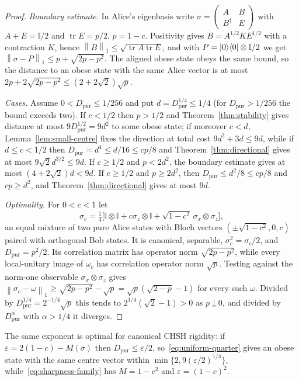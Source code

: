 \documentclass[11pt]{article}
\theoremstyle{remark}\newtheorem{remark}[theorem]{Remark}
\DeclareMathOperator{\tr}{tr}\DeclareMathOperator{\diag}{diag}
\newcommand{\id}{\mathbb I}\newcommand{\ket}[1]{|#1\rangle}
\newcommand{\norm}[1]{\left\lVert#1\right\rVert}
\newcommand{\eps}{\varepsilon}
\newcommand{\Dp}{D_{\mathrm{pur}}}
\begin{document}
\begin{proof}
\emph{Boundary estimate.} In Alice's eigenbasis write
$\sigma=\left(\begin{smallmatrix}A&B\\B^\dagger&E\end{smallmatrix}\right)$ with
$A+E=\id/2$ and $\tr E=p/2$, $p=1-c$. Positivity gives $B=A^{1/2}KE^{1/2}$ with
a contraction $K$, hence $\norm B_1\le\sqrt{\tr A\tr E}$, and with
$P=\proj0\otimes\id/2$ we get $\norm{\sigma-P}_1\le p+\sqrt{2p-p^2}$. The
aligned obese state obeys the same bound, so the distance to an obese state
with the same Alice vector is at most $2p+2\sqrt{2p-p^2}\le(2+2\sqrt2)\sqrt p$.

\emph{Cases.} Assume $0<\Dp\le1/256$ and put $d=\Dp^{1/4}\le1/4$ (for
$\Dp>1/256$ the bound exceeds two). If $c<1/2$ then $p>1/2$ and
Theorem~\ref{thm:stability} gives distance at most $9\Dp^{1/2}=9d^2$ to some
obese state; if moreover $c<d$, Lemma~\ref{lem:small-centre} fixes the
direction at total cost $9d^2+3d\le9d$, while if $d\le c<1/2$ then
$\Dp=d^4\le d/16\le cp/8$ and Theorem~\ref{thm:directional} gives at most
$9\sqrt2d^{3/2}\le9d$. If $c\ge1/2$ and $p<2d^2$, the boundary estimate gives
at most $(4+2\sqrt2)d<9d$. If $c\ge1/2$ and $p\ge2d^2$, then
$\Dp\le d^2/8\le cp/8$ and $cp\ge d^2$, and Theorem~\ref{thm:directional} gives
at most $9d$.

\emph{Optimality.} For $0<c<1$ let
\begin{equation}\label{eq:sharpness-family}
 \sigma_c=\tfrac14\bigl[\id\otimes\id+c\sigma_z\otimes\id+\sqrt{1-c^2}\,\sigma_x\otimes\sigma_z\bigr],
\end{equation}
an equal mixture of two pure Alice states with Bloch vectors
$(\pm\sqrt{1-c^2},0,c)$ paired with orthogonal Bob states. It is canonical,
separable, $\sigma_c^2=\sigma_c/2$, and $\Dp=p^2/2$. Its correlation matrix
has operator norm $\sqrt{2p-p^2}$, while every local-unitary image of
$\omega_c$ has correlation operator norm $\sqrt p$. Testing against the
norm-one observable $\sigma_x\otimes\sigma_z$ gives
$\norm{\sigma_c-\omega}_1\ge\sqrt{2p-p^2}-\sqrt p=\sqrt p(\sqrt{2-p}-1)$ for
every such $\omega$. Divided by $\Dp^{1/4}=2^{-1/4}\sqrt p$ this tends to
$2^{1/4}(\sqrt2-1)>0$ as $p\downarrow0$, and divided by $\Dp^{\alpha}$ with
$\alpha>1/4$ it diverges.
\end{proof}
The same exponent is optimal for canonical CHSH rigidity: if
$\eps=2(1-c)-M(\sigma)$ then $\Dp\le\eps/2$, so~\eqref{eq:uniform-quarter}
gives an obese state with the same centre vector within
$\min\{2,9(\eps/2)^{1/4}\}$, while~\eqref{eq:sharpness-family} has
$M=1-c^2$ and $\eps=(1-c)^2$.
\end{document}
